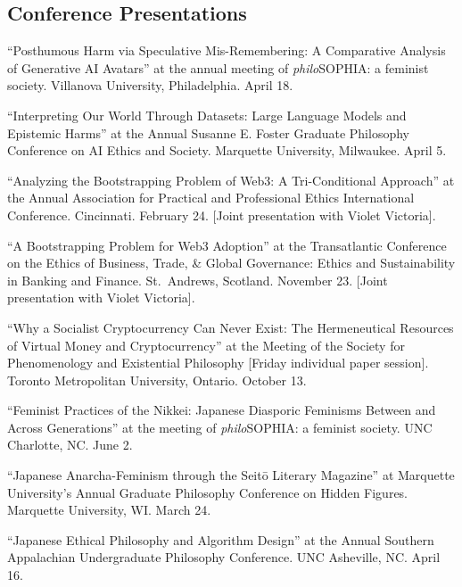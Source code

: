 \documentclass{article}
\begin{document}
\subsection*{\normalsize{Conference Presentations}}
\begin{tablist}
    \item[2026] \tab{}\enquote{Posthumous Harm via Speculative Mis-Remembering: A Comparative Analysis of Generative AI Avatars} at the  annual meeting of \textit{philo}SOPHIA: a feminist society. Villanova University, Philadelphia. April 18.
    \item[2025] \tab{}\enquote{Interpreting Our World Through Datasets: Large Language Models and Epistemic Harms} at the  Annual Susanne E. Foster Graduate Philosophy Conference on AI Ethics and Society. Marquette University, Milwaukee. April 5.
    \item[2024] \tab{}\enquote{Analyzing the Bootstrapping Problem of Web3: A Tri-Conditional Approach} at the  Annual Association for Practical and Professional Ethics International Conference. Cincinnati. February 24. [Joint presentation with Violet Victoria].
    \item[2023] \tab{}\enquote{A Bootstrapping Problem for Web3 Adoption} at the  Transatlantic Conference on the Ethics of Business, Trade, \& Global Governance: Ethics and Sustainability in Banking and Finance. St.~Andrews, Scotland. November 23. [Joint presentation with Violet Victoria].
    \item[] \tab{}\enquote{Why a Socialist Cryptocurrency Can Never Exist: The Hermeneutical Resources of Virtual Money and Cryptocurrency} at the  Meeting of the Society for Phenomenology and Existential Philosophy [Friday individual paper session]. Toronto Metropolitan University, Ontario. October 13.
    \item[] \tab{}\enquote{Feminist Practices of the Nikkei: Japanese Diasporic Feminisms Between and Across Generations} at the  meeting of \textit{philo}SOPHIA: a feminist society. UNC Charlotte, NC. June 2.
    \item[] \tab{}\enquote{Japanese Anarcha-Feminism through the Seitō Literary Magazine} at Marquette University's Annual Graduate Philosophy Conference on Hidden Figures. Marquette University, WI. March 24.
    \item[2022] \tab{}\enquote{Japanese Ethical Philosophy and Algorithm Design} at the  Annual Southern Appalachian Undergraduate Philosophy Conference. UNC Asheville, NC. April 16.
\end{tablist}
\end{document}
